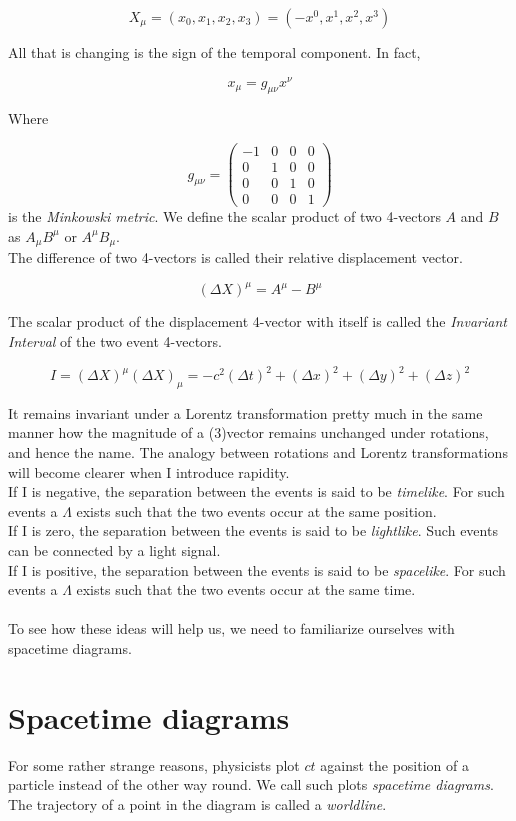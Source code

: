 \documentclass[12pt]{article}
\begin{document}
\[X_{\mu} = (x_0,x_1,x_2,x_3) = (-x^0,x^1,x^2,x^3)\]

All that is changing is the sign of the temporal component. In fact,

\[x_{\mu} = g_{\mu\nu}x^{\nu}\]

Where 

\[
g_{\mu\nu} = \begin{pmatrix}
-1 & 0 & 0 & 0\\
0 & 1 & 0 & 0\\
0 & 0 & 1 & 0\\
0 & 0 & 0 & 1
\end{pmatrix}
\]
is the \textit{Minkowski metric}.
We define the scalar product of two 4-vectors $A$ and $B$ as $A_{\mu}B^{\mu}$ or $A^{\mu}B_{\mu}$. \\
The difference of two 4-vectors is called their relative displacement vector. 

\[(\Delta X)^{\mu} = A^{\mu} - B^{\mu}\]

The scalar product of the displacement 4-vector with itself is called the \textit{Invariant Interval} of the two event 4-vectors.

\[I =(\Delta X)^{\mu}(\Delta X)_{\mu} = -c^2(\Delta t)^2 + (\Delta x)^2 + (\Delta y)^2 + (\Delta z)^2\]

It remains invariant under a Lorentz transformation pretty much in the same manner how the magnitude of a (3)vector remains unchanged under 
rotations, and hence the name. The analogy between rotations and Lorentz transformations will become clearer when I introduce rapidity. \\
If I is negative, the separation between the events is said to be \textit{timelike}. For such events a $\Lambda$ exists such that the two events occur at the same position.\\ 
If I is zero, the separation between the events is said to be \textit{lightlike}. Such events can be connected by a light signal. \\
If I is positive, the separation between the events is said to be \textit{spacelike}. For such events a $\Lambda$ exists such that the two events occur at the same time.\\\\
To see how these ideas will help us, we need to familiarize ourselves 
with spacetime diagrams.
\section{Spacetime diagrams}
For some rather strange reasons, physicists plot $ct$ against the position of a particle instead of the other way round. 
We call such plots \textit{spacetime diagrams}. The trajectory of a point in the diagram is called a \textit{worldline}. 
\end{document}
